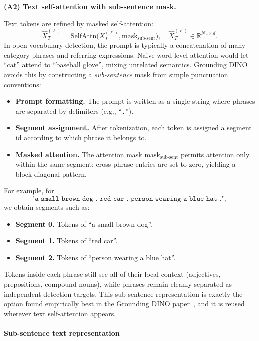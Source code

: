 \begin{enrichment}
\begin{enrichment}[Method][subsection]
		\medskip
		
		\noindent\textbf{(A2) Text self-attention with sub-sentence mask.}
		
		Text tokens are refined by masked self-attention:
		\[
		\hat{X}_T^{(\ell)} = \text{SelfAttn}\bigl(X_T^{(\ell)}, \text{mask}_{\text{sub-sent}}\bigr), \quad \hat{X}_T^{(\ell)} \in \mathbb{R}^{N_T \times d}.
		\]
		In open-vocabulary detection, the prompt is typically a concatenation of many category phrases and referring expressions. Naive word-level attention would let ``cat'' attend to ``baseball glove'', mixing unrelated semantics. Grounding DINO avoids this by constructing a \emph{sub-sentence} mask from simple punctuation conventions:
		\begin{itemize}
			\item \textbf{Prompt formatting.} The prompt is written as a single string where phrases are separated by delimiters (e.g., ``\texttt{.}'').
			\item \textbf{Segment assignment.} After tokenization, each token is assigned a segment id according to which phrase it belongs to.
			\item \textbf{Masked attention.} The attention mask \(\text{mask}_{\text{sub-sent}}\) permits attention only within the same segment; cross-phrase entries are set to zero, yielding a block-diagonal pattern.
		\end{itemize}
		For example, for
		\[
		\texttt{"a small brown dog . red car . person wearing a blue hat ."},
		\]
		we obtain segments such as:
		\begin{itemize}
			\item \textbf{Segment 0.} Tokens of ``a small brown dog''.
			\item \textbf{Segment 1.} Tokens of ``red car''.
			\item \textbf{Segment 2.} Tokens of ``person wearing a blue hat''.
		\end{itemize}
		Tokens inside each phrase still see all of their local context (adjectives, prepositions, compound nouns), while phrases remain cleanly separated as independent detection targets. This sub-sentence representation is exactly the option found empirically best in the Grounding DINO paper~\cite{liu2023_groundingdino}, and it is reused wherever text self-attention appears.
		
		\paragraph{Sub-sentence text representation}
		\label{subsubsec:chapter14_groundingdino_method_textrepr}
		

\end{enrichment}
\end{enrichment}
